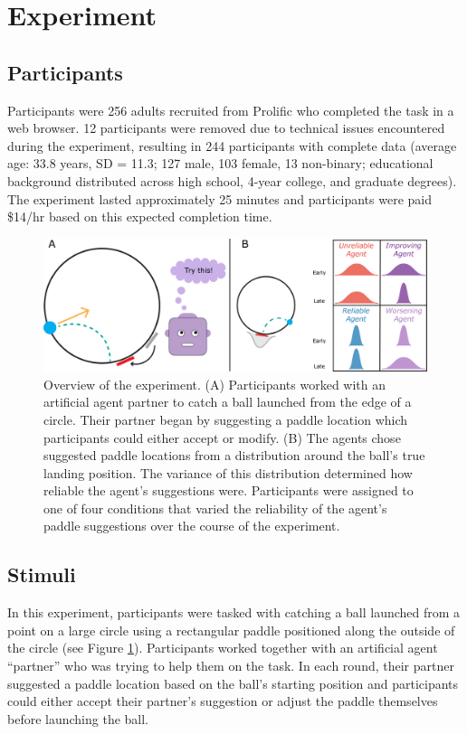 \documentclass[10pt,letterpaper]{article}
\begin{document}
\section{Experiment}

\subsection{Participants}

Participants were 256 adults recruited from Prolific who completed the task in a web browser. 12 participants were removed due to technical issues encountered during the experiment, resulting in 244 participants with complete data (average age: 33.8 years, SD = 11.3; 127 male, 103 female, 13 non-binary; educational background distributed across high school, 4-year college, and graduate degrees). The experiment lasted approximately 25 minutes and participants were paid \$14/hr based on this expected completion time. 



\begin{figure}[hbtp]
\vspace{-8mm}
\includegraphics[width=\textwidth]{img/expt_overview.jpg} 
\vspace{-4mm}
\caption{Overview of the experiment. (A) Participants worked with an artificial agent partner to catch a ball launched from the edge of a circle. Their partner began by suggesting a paddle location which participants could either accept or modify. (B) The agents chose suggested paddle locations from a distribution around the ball's true landing position. The variance of this distribution determined how reliable the agent's suggestions were. Participants were assigned to one of four conditions that varied the reliability of the agent's paddle suggestions over the course of the experiment.} 
\label{fig:stimuli}
\end{figure}




\subsection{Stimuli}
In this experiment, participants were tasked with catching a ball launched from a point on a large circle using a rectangular paddle positioned along the outside of the circle (see Figure \ref{fig:stimuli}).\footnotemark{} 
Participants worked together with an artificial agent ``partner'' who was trying to help them on the task. In each round, their partner suggested a paddle location based on the ball's starting position and participants could either accept their partner's suggestion or adjust the paddle themselves before launching the ball.  
\end{document}
